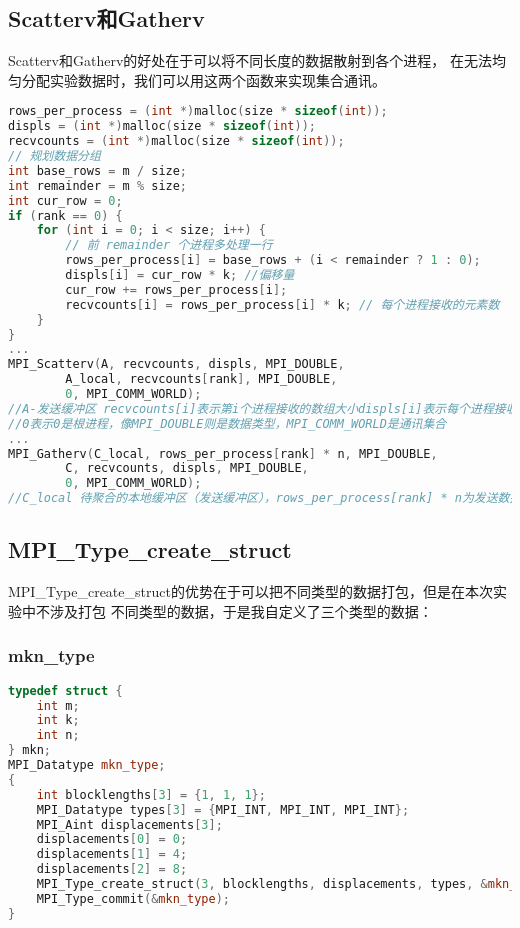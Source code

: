 \documentclass{SYSUReport}
\begin{document}
\subsection{Scatterv和Gatherv}
Scatterv和Gatherv的好处在于可以将不同长度的数据散射到各个进程，
在无法均匀分配实验数据时，我们可以用这两个函数来实现集合通讯。
\begin{lstlisting}[language=c++]
rows_per_process = (int *)malloc(size * sizeof(int));
displs = (int *)malloc(size * sizeof(int));
recvcounts = (int *)malloc(size * sizeof(int));
// 规划数据分组
int base_rows = m / size;
int remainder = m % size;
int cur_row = 0;
if (rank == 0) {
    for (int i = 0; i < size; i++) {
        // 前 remainder 个进程多处理一行
        rows_per_process[i] = base_rows + (i < remainder ? 1 : 0);
        displs[i] = cur_row * k; //偏移量
        cur_row += rows_per_process[i];
        recvcounts[i] = rows_per_process[i] * k; // 每个进程接收的元素数
    }
}
...
MPI_Scatterv(A, recvcounts, displs, MPI_DOUBLE,
        A_local, recvcounts[rank], MPI_DOUBLE,
        0, MPI_COMM_WORLD);
//A-发送缓冲区 recvcounts[i]表示第i个进程接收的数组大小displs[i]表示每个进程接收的数据在A中的起始位置。
//0表示0是根进程，像MPI_DOUBLE则是数据类型，MPI_COMM_WORLD是通讯集合
...
MPI_Gatherv(C_local, rows_per_process[rank] * n, MPI_DOUBLE,
        C, recvcounts, displs, MPI_DOUBLE,
        0, MPI_COMM_WORLD);
//C_local 待聚合的本地缓冲区（发送缓冲区），rows_per_process[rank] * n为发送数据量，c为接收缓冲区，recvcounts是一个存储了各个进程发送量的数组，displs决定了每个进程发送来的数据将在C的什么位置开始记录。
\end{lstlisting}
\subsection{MPI\_Type\_create\_struct}
MPI\_Type\_create\_struct的优势在于可以把不同类型的数据打包，但是在本次实验中不涉及打包
不同类型的数据，于是我自定义了三个类型的数据：
\subsubsection{mkn\_type}
\begin{lstlisting}[language=c++]
typedef struct {
    int m;
    int k;
    int n;
} mkn;
MPI_Datatype mkn_type;
{
    int blocklengths[3] = {1, 1, 1};
    MPI_Datatype types[3] = {MPI_INT, MPI_INT, MPI_INT};
    MPI_Aint displacements[3];
    displacements[0] = 0;
    displacements[1] = 4;
    displacements[2] = 8;
    MPI_Type_create_struct(3, blocklengths, displacements, types, &mkn_type);
    MPI_Type_commit(&mkn_type);
}
\end{lstlisting}
\end{document}
